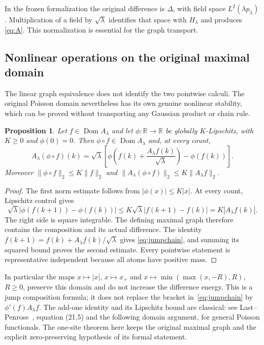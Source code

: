 \documentclass[11pt]{article}
\newtheorem{proposition}[theorem]{Proposition}
\newcommand{\R}{\mathbb R}\newcommand{\N}{\mathbb N}
\newcommand{\Dom}{\operatorname{Dom}}
\begin{document}
In the frozen formalization the original difference is $\Delta$, with
field space $L^2(\lambda p_\lambda)$. Multiplication of a field by
$\sqrt\lambda$ identifies that space with $H_\lambda$ and produces
\eqref{eq:A}. This normalization is essential for the graph transport.


\subsection*{Nonlinear operations on the original maximal domain}
The linear graph equivalence does not identify the two pointwise
calculi. The original Poisson domain nevertheless has its own genuine
nonlinear stability, which can be proved without transporting any
Gaussian product or chain rule.

\begin{proposition}\label{prop:poissonlip}
Let $f\in\Dom A_\lambda$ and let $\phi:\R\to\R$ be globally
$K$-Lipschitz, with $K\geq0$ and $\phi(0)=0$.
Then $\phi\circ f\in\Dom A_\lambda$ and, at every count,
\begin{equation}\label{eq:jumpchain}
 A_\lambda(\phi\circ f)(k)=\sqrt\lambda
 \left[\phi\left(f(k)+\frac{A_\lambda f(k)}{\sqrt\lambda}\right)
              -\phi(f(k))\right].
\end{equation}
Moreover $\|\phi\circ f\|_2\leq K\|f\|_2$ and
$\|A_\lambda(\phi\circ f)\|_2\leq K\|A_\lambda f\|_2$.
\end{proposition}
\begin{proof}
The first norm estimate follows from $|\phi(x)|\leq K|x|$.
At every count, Lipschitz control gives
\[
 \sqrt\lambda|\phi(f(k+1))-\phi(f(k))|
 \leq K\sqrt\lambda|f(k+1)-f(k)|=K|A_\lambda f(k)|.
\]
The right side is square integrable. The defining maximal graph
therefore contains the composition and its actual difference. The
identity $f(k+1)=f(k)+A_\lambda f(k)/\sqrt\lambda$ gives
\eqref{eq:jumpchain}, and summing its squared bound proves the
second estimate. Every pointwise statement is representative independent
because all atoms have positive mass.
\end{proof}
In particular the maps $x\mapsto|x|$, $x\mapsto x_+$ and
$x\mapsto\min(\max(x,-R),R)$, $R\geq0$, preserve this domain and
do not increase the difference energy. This is a jump composition
formula; it does not replace the bracket in~\eqref{eq:jumpchain} by
$\phi'(f)A_\lambda f$. The add-one identity and its Lipschitz bound
are classical: see Last--Penrose~\cite{LastPenrose}, equation (21.5)
and the following domain argument, for general Poisson functionals.
The one-site theorem here keeps the original maximal graph and the
explicit zero-preserving hypothesis of its formal statement.
\end{document}

